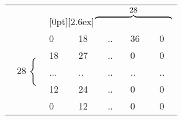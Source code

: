 \begin{tabular}{llllll}
                                        & \multicolumn{5}{c}{\enspace\raisebox{-3.3ex}[0pt][2.6ex]{$ \overbrace{\vphantom{-}\hspace{9.5em}}^{\textstyle 28}$}}                                                                                                         \\ \cline{2-6} 
\multicolumn{1}{l|}{\multirow{5}{*}{\hspace{-1em}$\left.\begin{array}{l}\\ \\ \\ \\ \\ \end{array}28\right\lbrace$}} & \multicolumn{1}{l|}{0}  & \multicolumn{1}{l|}{18} & \multicolumn{1}{l|}{..} & \multicolumn{1}{l|}{36} & \multicolumn{1}{l|}{0}  \\ \cline{2-3} \cline{5-6} 
\multicolumn{1}{l|}{}                   & \multicolumn{1}{l|}{18} & \multicolumn{1}{l|}{27} & \multicolumn{1}{l|}{..} & \multicolumn{1}{l|}{0}  & \multicolumn{1}{l|}{0}  \\ \cline{2-3} \cline{5-6} 
\multicolumn{1}{l|}{}                   & ...                     & ..                      & ..                      & ..                      & \multicolumn{1}{l|}{..} \\ \cline{2-3} \cline{5-6} 
\multicolumn{1}{l|}{}                   & \multicolumn{1}{l|}{12} & \multicolumn{1}{l|}{24} & \multicolumn{1}{l|}{..} & \multicolumn{1}{l|}{0}  & \multicolumn{1}{l|}{0}  \\ \cline{2-3} \cline{5-6} 
\multicolumn{1}{l|}{}                   & \multicolumn{1}{l|}{0}  & \multicolumn{1}{l|}{12} & \multicolumn{1}{l|}{..} & \multicolumn{1}{l|}{0}  & \multicolumn{1}{l|}{0}  \\ \cline{2-6} 
\end{tabular}